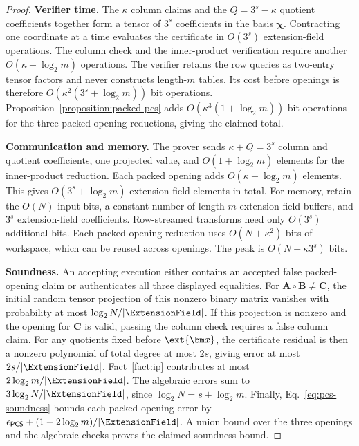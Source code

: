 \begin{proof}
\smallskip\noindent\textbf{Verifier time.}
The \(\kappa\) column claims and the \(Q=3^s-\kappa\)
quotient coefficients together form a tensor of \(3^s\)
coefficients in the basis \(\bm\chi\).
Contracting one coordinate at a time evaluates the certificate
in \(O(3^s)\) extension-field operations.
The column check and the inner-product verification require
another \(O(\kappa+\log_2m)\) operations.
The verifier retains the row queries as two-entry tensor factors
and never constructs length-\(m\) tables.
Its cost before openings is therefore
\(O(\kappa^2(3^s+\log_2m))\) bit operations.
Proposition~\ref{proposition:packed-pcs} adds
\(O(\kappa^3(1+\log_2m))\) bit operations for the three
packed-opening reductions, giving the claimed total.

\smallskip\noindent\textbf{Communication and memory.}
The prover sends \(\kappa+Q=3^s\) column and quotient
coefficients, one projected value, and
\(O(1+\log_2m)\) elements for the inner-product reduction.
Each packed opening adds \(O(\kappa+\log_2m)\) elements.
This gives \(O(3^s+\log_2m)\) extension-field elements in total.
For memory, retain the \(O(N)\) input bits, a constant number
of length-\(m\) extension-field buffers, and \(3^s\)
extension-field coefficients. Row-streamed transforms need
only \(O(3^s)\) additional bits.
Each packed-opening reduction uses \(O(N+\kappa^2)\) bits
of workspace, which can be reused across openings.
The peak is \(O(N+\kappa3^s)\) bits.

\smallskip\noindent\textbf{Soundness.}
An accepting execution either contains an accepted false
packed-opening claim or authenticates all three displayed equalities.
For \(\bm A\circ\bm B\neq\bm C\), the initial random
tensor projection of this nonzero binary matrix vanishes with
probability at most \(\log_2N/|\ExtensionField|\).
If this projection is nonzero and the opening for \(\bm C\)
is valid, passing the column check requires a false column claim.
For any quotients fixed before \(\ext{\bm x}\),
the certificate residual is then a nonzero polynomial of total
degree at most \(2s\), giving error at most
\(2s/|\ExtensionField|\).
Fact~\ref{fact:ip} contributes at most
\(2\log_2m/|\ExtensionField|\).
The algebraic errors sum to
\(3\log_2N/|\ExtensionField|\), since
\(\log_2N=s+\log_2m\).
Finally, Eq.~\eqref{eq:pcs-soundness} bounds each packed-opening
error by
\(\epsilon_{\mathsf{PCS}}+(1+2\log_2m)/|\ExtensionField|\).
A union bound over the three openings and the algebraic checks
proves the claimed soundness bound.
\end{proof}

